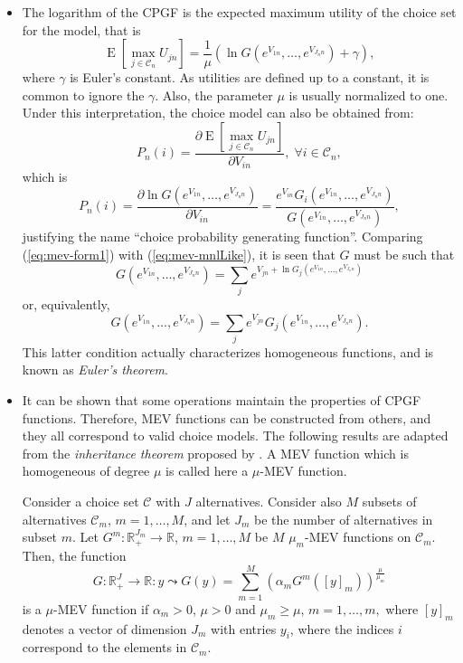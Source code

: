 \documentclass[12pt,a4paper]{article}
\newcommand{\req}[1]{(\ref{#1})}
\newcommand{\C}{\mathcal{C}}
\newcommand{\expect}{\operatorname{E}}
\begin{document}
\begin{itemize}
\item The logarithm of the CPGF  is the expected maximum utility
of the choice set for the  model, that is
\begin{equation}
\label{eq:cpgfExpMaxUtil}
\expect[\max_{j\in\C_n}U_{jn}] = \frac{1}{\mu}(\ln G(e^{V_{1n}},\ldots,e^{V_{J_nn}}) + \gamma),
\end{equation}
where $\gamma$ is Euler's constant. As utilities are defined up to a constant, it is common to ignore the $\gamma$. Also, the parameter $\mu$ is usually normalized to one.
Under this interpretation, the choice model can also be obtained from:
\[
P_n(i) = \frac{\partial \expect[\max_{j\in\C_n}U_{jn}]}{\partial V_{in}} , \; \forall i \in \C_n,
\]
which is
\begin{equation}
\label{eq:mev-form1}
P_n(i) = \frac{\partial  \ln G(e^{V_{1n}},\ldots,e^{V_{J_nn}})}{\partial V_{in}} = \frac{e^{V_{in}}G_i(e^{V_{1n}},\ldots,e^{V_{J_nn}})}{G(e^{V_{1n}},\ldots,e^{V_{J_nn}})},
\end{equation}
justifying the name ``choice probability generating function''.
Comparing \req{eq:mev-form1} with \req{eq:mev-mnlLike}, it is seen that $G$ must be such that
\begin{equation}
G(e^{V_{1n}},\ldots,e^{V_{J_nn}}) = \sum_j e^{V_{jn} + \ln G_j\left(e^{V_{1n}},\ldots,e^{V_{J_n n}}\right)}
\end{equation}
or, equivalently,
\begin{equation}
G(e^{V_{1n}},\ldots,e^{V_{J_nn}}) = \sum_j  e^{V_{jn} } G_j\left(e^{V_{1n}},\ldots,e^{V_{J_n n}}\right). 
\end{equation}
This latter condition actually characterizes homogeneous functions,
and is known as \emph{Euler's theorem}.
\item \label{item:9-networkMEV-inheritance} It can be shown
 that some operations maintain the properties
of  CPGF functions. Therefore, MEV functions can be constructed
from others, and they all correspond to valid choice models.  
The following results are adapted from the  \emph{inheritance theorem}
proposed by . A MEV function which is
homogeneous of degree $\mu$ is called here a $\mu$-MEV function.


Consider a choice set $\C$ with $J$ alternatives. Consider also $M$
subsets of alternatives $\C_m$, $m=1,\ldots,M$, and let $J_m$ be the
number of alternatives in subset $m$. 
 Let $G^m:\mathbb{R}_+^{J_m}\longrightarrow \mathbb{R}$, $m=1,\ldots,M$ be $M$ $\mu_m$-MEV functions on $\C_m$.
Then, the function
\begin{equation}
\label{eq:rnev}
G:\mathbb{R}_+^{J}\longrightarrow \mathbb{R}: y \leadsto G(y) = \sum_{m=1}^M \left(\alpha_m G^m([y]_m)\right)^{\frac{\mu}{\mu_m}}
\end{equation}
is  a $\mu$-MEV function if $\alpha_m > 0$, $\mu > 0$ and $\mu_m \geq \mu$,
$m=1,\ldots,m,$ where  $[y]_m$ denotes a vector of dimension $J_m$ with entries  $y_i$, where the indices $i$ correspond to the elements in $\C_m$.


\end{itemize}
\end{document}
